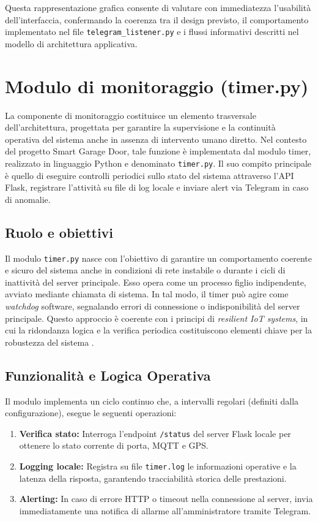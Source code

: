 Questa rappresentazione grafica consente di valutare con immediatezza
l’usabilità dell’interfaccia, confermando la coerenza tra il design previsto,
il comportamento implementato nel file \texttt{telegram\_listener.py} e i flussi
informativi descritti nel modello di architettura applicativa.



\section{Modulo di monitoraggio (timer.py)}
La componente di monitoraggio costituisce un elemento trasversale dell'architettura, progettata per garantire la supervisione e la continuità operativa del sistema anche in assenza di intervento umano diretto. Nel contesto del progetto Smart Garage Door, tale funzione è implementata dal modulo timer, realizzato in linguaggio Python e denominato \texttt{timer.py}. Il suo compito principale è quello di eseguire controlli periodici sullo stato del sistema attraverso l'API Flask, registrare l'attività su file di log locale e inviare alert via Telegram in caso di anomalie.

\subsection*{Ruolo e obiettivi}
Il modulo \texttt{timer.py} nasce con l'obiettivo di garantire un comportamento coerente e sicuro del sistema anche in condizioni di rete instabile o durante i cicli di inattività del server principale. Esso opera come un processo figlio indipendente, avviato mediante chiamata di sistema. In tal modo, il timer può agire come \textit{watchdog} software, segnalando errori di connessione o indisponibilità del server principale.
Questo approccio è coerente con i principi di \textit{resilient IoT systems}, in cui la ridondanza logica e la verifica periodica costituiscono elementi chiave per la robustezza del sistema \cite{Chung2020, Avizienis2004}.

\subsection*{Funzionalità e Logica Operativa}
Il modulo implementa un ciclo continuo che, a intervalli regolari (definiti dalla configurazione), esegue le seguenti operazioni:
\begin{enumerate}
    \item \textbf{Verifica stato:} Interroga l'endpoint \texttt{/status} del server Flask locale per ottenere lo stato corrente di porta, MQTT e GPS.
    \item \textbf{Logging locale:} Registra su file \texttt{timer.log} le informazioni operative e la latenza della risposta, garantendo tracciabilità storica delle prestazioni.
    \item \textbf{Alerting:} In caso di errore HTTP o timeout nella connessione al server, invia immediatamente una notifica di allarme all'amministratore tramite Telegram.
\end{enumerate}


